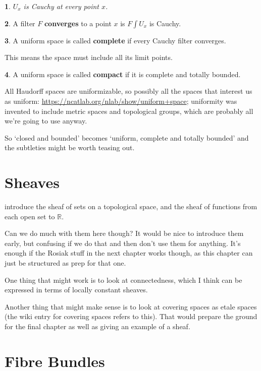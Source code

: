 \documentclass[oneside,english]{amsbook}
\numberwithin{section}{chapter}
\theoremstyle{plain}
\newtheorem{thm}{\protect\theoremname}
\theoremstyle{definition}
\newtheorem{defn}[thm]{\protect\definitionname}
\providecommand{\definitionname}{Definition}
\providecommand{\theoremname}{Theorem}
\begin{document}
\begin{thm}
	$U_x$ is Cauchy at every point $x$.
\end{thm}

\begin{defn}
	A filter $F$ \textbf{converges} to a point $x$ is $F\int U_x$ is Cauchy.
\end{defn}

\begin{defn}
	A uniform space is called \textbf{complete} if every Cauchy filter converges.
\end{defn}

This means the space must include all its limit points. 

\begin{defn}
	A uniform space is called \textbf{compact} if it is complete and totally bounded.
\end{defn}

All Haudorff spaces are uniformizable, so possibly all the spaces that interest us as uniform: \url{https://ncatlab.org/nlab/show/uniform+space}; uniformity was invented to include metric spaces and topological groups, which are probably all we're going to use anyway. 

So `closed and bounded' becomes `uniform, complete and totally bounded' and the subtleties might be worth teasing out.


\chapter{Sheaves}

introduce the sheaf of sets on a topological space, and the sheaf of functions from each open set to $\mathbb{R}$.

Can we do much with them here though? It would be nice to introduce them early, but confusing if we do that and then don't use them for anything. It's enough if the Rosiak stuff in the next chapter works though, as this chapter can just be structured as prep for that one.

One thing that might work is to look at connectedness, which I think can be expressed in terms of locally constant sheaves.

Another thing that might make sense is to look at covering spaces as etale spaces (the wiki entry for covering spaces refers to this). That would prepare the ground for the final chapter as well as giving an example of a sheaf.

\chapter{Fibre Bundles}
\end{document}
